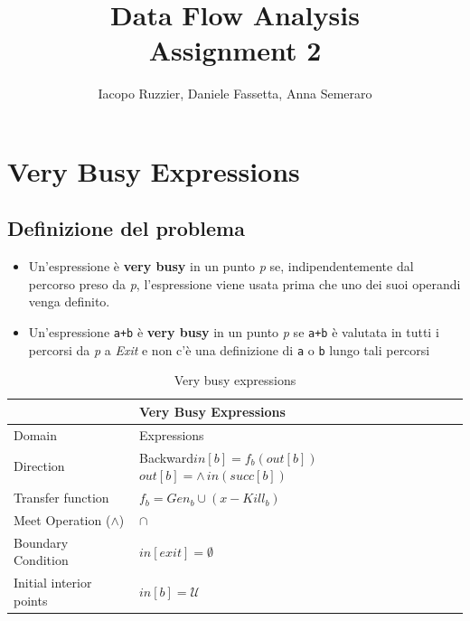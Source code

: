 \documentclass[10pt,a4paper]{article}
\begin{document}
\title{Data Flow Analysis \\
\large Assignment 2}
\author{Iacopo Ruzzier, Daniele Fassetta, Anna Semeraro}

\maketitle
\tableofcontents

\newpage

\section{Very Busy Expressions}
\subsection{Definizione del problema}

\begin{itemize}
  \item Un'espressione \`e \textbf{very busy} in un punto \textit{p} se, indipendentemente dal percorso preso da \textit{p}, l'espressione viene usata prima che uno dei suoi operandi venga definito.
  \item Un'espressione \lstinline|a+b| \`e \textbf{very busy} in un punto \textit{p} se \lstinline|a+b| \`e valutata in tutti i percorsi da \textit{p} a \textit{Exit} e non c'\`e una definizione di \lstinline|a| o \lstinline|b| lungo tali percorsi
\end{itemize}


\begin{table}[h!]
  \centering
  \begin{tabular}{|l|p{4cm}|}
    \hline
    \textbf{} & \textbf{Very Busy Expressions} \\
    \hline
    Domain & Expressions\\
    \hline
    Direction & Backward\newline $in[b]=f_{b}(out[b])$\newline $out[b]=\wedge\, in(succ[b])$\\
    \hline
    Transfer function & $f_b = Gen_b \cup (x - Kill_b) $\\
    \hline
    Meet Operation ($\land$) & $\cap$ \\
    \hline
    Boundary Condition & $in[exit] = \emptyset$ \\
    \hline
    Initial interior points & $in[b] = \mathcal{U}$ \\
    \hline
  \end{tabular}
  \caption{Very busy expressions}
\end{table}
\end{document}
